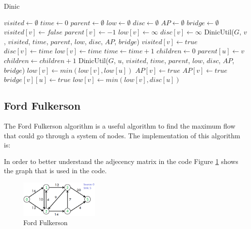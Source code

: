 \begin{algorithm}
\caption{Dinic}
\label{alg:dinic}
\begin{algorithmic}[1]
\State $visited \gets \emptyset$
\State $time \gets 0$
\State $parent \gets \emptyset$
\State $low \gets \emptyset$
\State $disc \gets \emptyset$
\State $AP \gets \emptyset$
\State $bridge \gets \emptyset$
\State $visited[v] \gets false$
\State $parent[v] \gets -1$
\State $low[v] \gets \infty$
\State $disc[v] \gets \infty$
\EndFor
{}
\State DinicUtil($G$, $v$, $visited$, $time$, $parent$, $low$, $disc$, $AP$, $bridge$)
\EndIf
\EndFor
\EndProcedure
{}
\State $visited[v] \gets true$
\State $disc[v] \gets time$
\State $low[v] \gets time$
\State $time \gets time + 1$
\State $children \gets 0$
\State $parent[u] \gets v$
\State $children \gets children + 1$
\State DinicUtil($G$, $u$, $visited$, $time$, $parent$, $low$, $disc$, $AP$, $bridge$)
\State $low[v] \gets min(low[v], low[u])$
\State $AP[v] \gets true$
\EndIf
{}
\State $AP[v] \gets true$
\EndIf
{}
\State $bridge[v][u] \gets true$
\EndIf
\Else
\State $low[v] \gets min(low[v], disc[u])$
\EndIf
\EndFor
\EndProcedure
\end{algorithmic}
\end{algorithm}

\subsection{Ford Fulkerson}

The Ford Fulkerson algorithm is a useful algorithm to find the maximum flow that could go through a system of nodes. The implementation of this algorithm is:



In order to better understand the adjecency matrix in the code Figure \ref{fig:ford_fulkerson} shows the graph that is used in the code.

\begin{figure}[h]
\centering
\includegraphics[width=0.35\textwidth]{../Figures/ford_fulkerson11.png}
\caption{Ford Fulkerson}
\label{fig:ford_fulkerson}
\end{figure}
